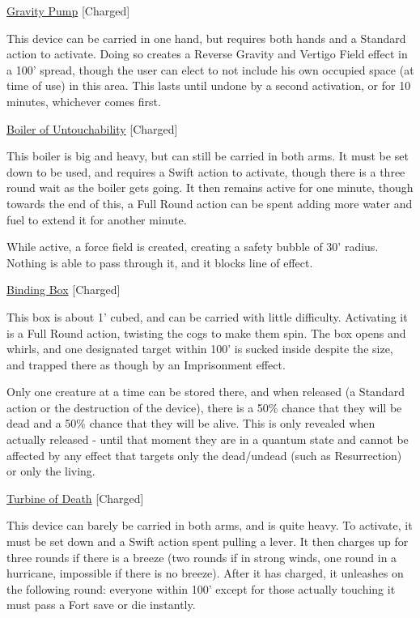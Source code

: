 \medskip\noindent\underline{Gravity Pump} [Charged]

\noindent This device can be carried in one hand, but requires both hands and a Standard action to activate. Doing so creates a Reverse Gravity and Vertigo Field effect in a 100' spread, though the user can elect to not include his own occupied space (at time of use) in this area. This lasts until undone by a second activation, or for 10 minutes, whichever comes first.

\medskip\noindent\underline{Boiler of Untouchability} [Charged]

\noindent This boiler is big and heavy, but can still be carried in both arms. It must be set down to be used, and requires a Swift action to activate, though there is a three round wait as the boiler gets going. It then remains active for one minute, though towards the end of this, a Full Round action can be spent adding more water and fuel to extend it for another minute.

\smallskip\noindent While active, a force field is created, creating a safety bubble of 30' radius. Nothing is able to pass through it, and it blocks line of effect.

\medskip\noindent\underline{Binding Box} [Charged]

\noindent This box is about 1' cubed, and can be carried with little difficulty. Activating it is a Full Round action, twisting the cogs to make them spin. The box opens and whirls, and one designated target within 100' is sucked inside despite the size, and trapped there as though by an Imprisonment effect.

\smallskip\noindent Only one creature at a time can be stored there, and when released (a Standard action or the destruction of the device), there is a 50\% chance that they will be dead and a 50\% chance that they will be alive. This is only revealed when actually released - until that moment they are in a quantum state and cannot be affected by any effect that targets only the dead/undead (such as Resurrection) or only the living.

\medskip\noindent\underline{Turbine of Death} [Charged]

\noindent This device can barely be carried in both arms, and is quite heavy. To activate, it must be set down and a Swift action spent pulling a lever. It then charges up for three rounds if there is a breeze (two rounds if in strong winds, one round in a hurricane, impossible if there is no breeze). After it has charged, it unleashes on the following round: everyone within 100' except for those actually touching it must pass a Fort save or die instantly.

